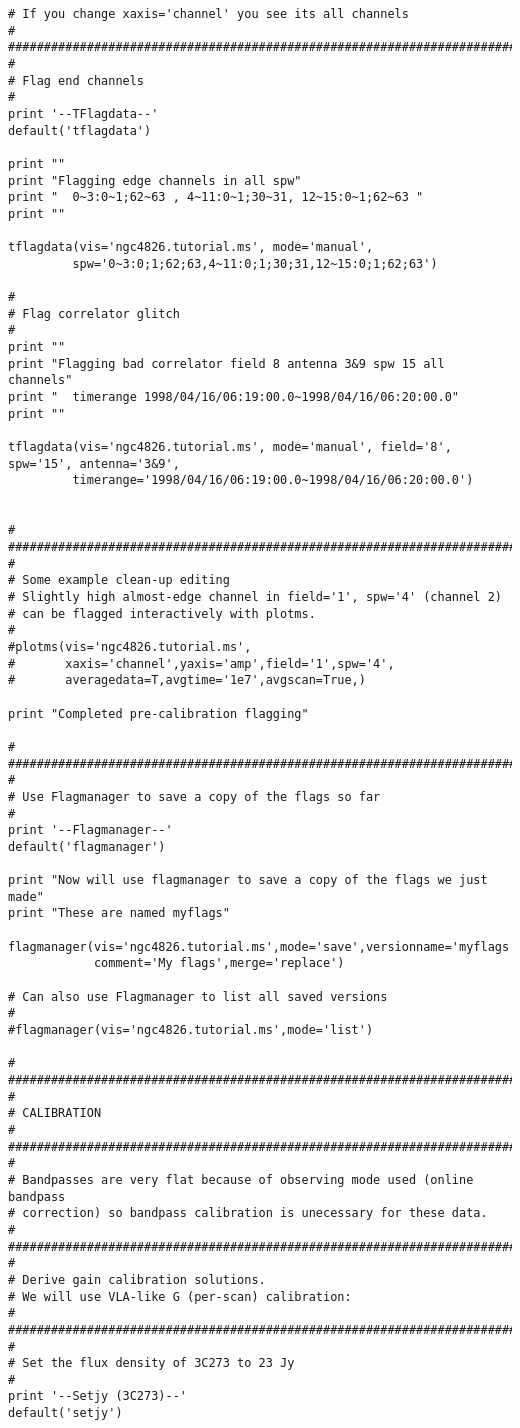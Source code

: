 \begin{verbatim}
# If you change xaxis='channel' you see its all channels
#
##########################################################################
#
# Flag end channels
#
print '--TFlagdata--'
default('tflagdata')

print ""
print "Flagging edge channels in all spw"
print "  0~3:0~1;62~63 , 4~11:0~1;30~31, 12~15:0~1;62~63 "
print ""

tflagdata(vis='ngc4826.tutorial.ms', mode='manual',
         spw='0~3:0;1;62;63,4~11:0;1;30;31,12~15:0;1;62;63')

#
# Flag correlator glitch
#
print ""
print "Flagging bad correlator field 8 antenna 3&9 spw 15 all channels"
print "  timerange 1998/04/16/06:19:00.0~1998/04/16/06:20:00.0"
print ""

tflagdata(vis='ngc4826.tutorial.ms', mode='manual', field='8', spw='15', antenna='3&9', 
         timerange='1998/04/16/06:19:00.0~1998/04/16/06:20:00.0')


#
##########################################################################
#
# Some example clean-up editing
# Slightly high almost-edge channel in field='1', spw='4' (channel 2)
# can be flagged interactively with plotms.
#
#plotms(vis='ngc4826.tutorial.ms',
#       xaxis='channel',yaxis='amp',field='1',spw='4',
#       averagedata=T,avgtime='1e7',avgscan=True,)

print "Completed pre-calibration flagging"

#
##########################################################################
#
# Use Flagmanager to save a copy of the flags so far
#
print '--Flagmanager--'
default('flagmanager')

print "Now will use flagmanager to save a copy of the flags we just made"
print "These are named myflags"

flagmanager(vis='ngc4826.tutorial.ms',mode='save',versionname='myflags',
            comment='My flags',merge='replace')

# Can also use Flagmanager to list all saved versions
#
#flagmanager(vis='ngc4826.tutorial.ms',mode='list')

#
##########################################################################
#
# CALIBRATION
#
##########################################################################
#
# Bandpasses are very flat because of observing mode used (online bandpass
# correction) so bandpass calibration is unecessary for these data.
#
##########################################################################
#
# Derive gain calibration solutions.
# We will use VLA-like G (per-scan) calibration:
#
##########################################################################
#
# Set the flux density of 3C273 to 23 Jy
#
print '--Setjy (3C273)--'
default('setjy')


\end{verbatim}
